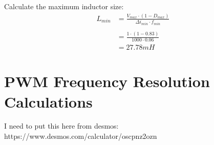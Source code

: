 Calculate the maximum inductor size:
\begin{align}
    L_{min} &= \frac{ V_{max} \cdot \left( 1 - D_{max} \right) } {\Delta i_{min} \cdot f_{min}}\\\nonumber
    \\ \nonumber
    &= \frac{1 \cdot (1 - 0.83)}{1000 \cdot 0.06}\\ \nonumber
    &= 27.78mH
\end{align}


\section*{PWM Frequency Resolution Calculations}

I need to put this here from desmos: https://www.desmos.com/calculator/oscpnz2ozn




